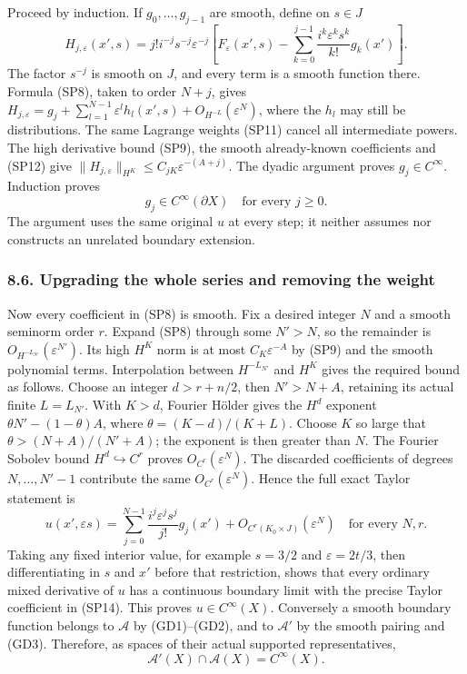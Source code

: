 \documentclass[
  11pt,
]{article}
\begin{document}
Proceed by induction. If \(g_0,\ldots,g_{j-1}\) are smooth, define on
\(s\in J\) \[
 H_{j,\varepsilon}(x',s)
  =j!i^{-j}s^{-j}\varepsilon^{-j}
      \left[F_\varepsilon(x',s)
       -\sum_{k=0}^{j-1}
          \frac{i^k\varepsilon^ks^k}{k!}g_k(x')\right].
 \tag{SP12}
\] The factor \(s^{-j}\) is smooth on \(J\), and every term is a smooth
function there. Formula (SP8), taken to order \(N+j\), gives
\(H_{j,\varepsilon}=g_j+\sum_{l=1}^{N-1}
\varepsilon^l h_l(x',s)+O_{H^{-L}}(\varepsilon^N)\), where the \(h_l\)
may still be distributions. The same Lagrange weights (SP11) cancel all
intermediate powers. The high derivative bound (SP9), the smooth
already-known coefficients and (SP12) give \(\|H_{j,\varepsilon}\|_{H^K}
\le C_{jK}\varepsilon^{-(A+j)}\). The dyadic argument proves
\(g_j\in C^\infty\). Induction proves \[
 g_j\in C^\infty(\partial X)
       \quad\text{for every }j\ge0.
 \tag{SP13}
\] The argument uses the same original \(u\) at every step; it neither
assumes nor constructs an unrelated boundary extension.

\subsubsection{8.6. Upgrading the whole series and removing the
weight}\label{upgrading-the-whole-series-and-removing-the-weight}

Now every coefficient in (SP8) is smooth. Fix a desired integer \(N\)
and a smooth seminorm order \(r\). Expand (SP8) through some \(N'>N\),
so the remainder is \(O_{H^{-L_{N'}}}(\varepsilon^{N'})\). Its high
\(H^K\) norm is at most \(C_K\varepsilon^{-A}\) by (SP9) and the smooth
polynomial terms. Interpolation between \(H^{-L_{N'}}\) and \(H^K\)
gives the required bound as follows. Choose an integer \(d>r+n/2\), then
\(N'>N+A\), retaining its actual finite \(L=L_{N'}\). With \(K>d\),
Fourier Hölder gives the \(H^d\) exponent \(\theta N'-(1-\theta)A\),
where \(\theta=(K-d)/(K+L)\). Choose \(K\) so large that
\(\theta>(N+A)/(N'+A)\); the exponent is then greater than \(N\). The
Fourier Sobolev bound \(H^d\hookrightarrow C^r\) proves
\(O_{C^r}(\varepsilon^N)\). The discarded coefficients of degrees
\(N,\ldots,N'-1\) contribute the same \(O_{C^r}(\varepsilon^N)\). Hence
the full exact Taylor statement is \[
 u(x',\varepsilon s)
  =\sum_{j=0}^{N-1}
       \frac{i^j\varepsilon^js^j}{j!}g_j(x')
       +O_{C^r(K_0\times J)}(\varepsilon^N)
 \quad\text{for every }N,r.
 \tag{SP14}
\] Taking any fixed interior value, for example \(s=3/2\) and
\(\varepsilon=2t/3\), then differentiating in \(s\) and \(x'\) before
that restriction, shows that every ordinary mixed derivative of \(u\)
has a continuous boundary limit with the precise Taylor coefficient in
(SP14). This proves \(u\in C^\infty(X)\). Conversely a smooth boundary
function belongs to \(\mathcal A\) by (GD1)--(GD2), and to
\(\mathcal A'\) by the smooth pairing and (GD3). Therefore, as spaces of
their actual supported representatives, \[
 \mathcal A'(X)\cap\mathcal A(X)=C^\infty(X).
 \tag{SP15}
\]
\end{document}
